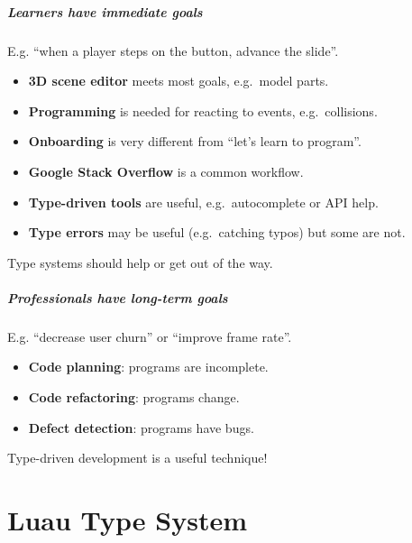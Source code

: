 \documentclass[aspectratio=169]{beamer}
\begin{document}
\begin{frame}

\frametitle{Learners have immediate goals}

E.g. ``when a player steps on the button, advance the slide''.
\begin{itemize}
  \item \textbf{3D scene editor} meets most goals, e.g.~model parts.
  \item \textbf{Programming} is needed for reacting to events, e.g.~collisions.
  \item \textbf{Onboarding} is very different from ``let's learn to program''.
  \item \textbf{Google Stack Overflow} is a common workflow.
  \item \textbf{Type-driven tools} are useful, e.g.~autocomplete or API help.
  \item \textbf{Type errors} may be useful (e.g.~catching typos) but some are not.
\end{itemize}
Type systems should help or get out of the way.

\end{frame}

\begin{frame}

\frametitle{Professionals have long-term goals}

E.g. ``decrease user churn'' or ``improve frame rate''.
\begin{itemize}
\item \textbf{Code planning}: programs are incomplete.
\item \textbf{Code refactoring}: programs change.
\item \textbf{Defect detection}: programs have bugs.
\end{itemize}
Type-driven development is a useful technique!

\end{frame}

\part{Luau Type System}
\end{document}
